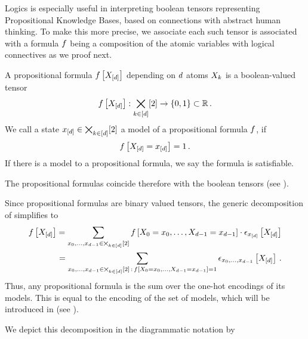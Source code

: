 
Logics is especially useful in interpreting boolean tensors representing Propositional Knowledge Bases, based on connections with abstract human thinking.
To make this more precise, we associate each such tensor is associated with a formula $f$ being a composition of the atomic variables with logical connectives as we proof next.

\begin{definition}\label{def:formulas}
	A propositional formula $f\left[X_{[d]}\right]$ depending on $d$ atoms $X_{k}$ is a boolean-valued tensor
	\begin{align*}
		f\left[X_{[d]}\right] : \bigtimes_{k\in[d]}[2] \rightarrow \{0,1\} \subset \mathbb{R} \, .
	\end{align*}
	We call a state $x_{[d]} \in \bigtimes_{k\in[d]}[2]$ a model of a propositional formula $f$, if
	\begin{align*}
		f\left[X_{[d]}=x_{[d]}\right]=1 \, .
	\end{align*}
	If there is a model to a propositional formula, we say the formula is satisfiable.
\end{definition}

The propositional formulas coincide therefore with the boolean tensors (see ).


Since propositional formulas are binary valued tensors, the generic decomposition of  simplifies to
\begin{align}\label{eq:formulaModelDecomposition}
	f\left[X_{[d]}\right] = \sum_{x_{0},\ldots,x_{d-1}\in\bigtimes_{k\in[d]}[2]} f\left[X_{0}=x_{0},\ldots,X_{d-1}=x_{d-1}\right] \cdot \epsilon_{x_{[d]}}\left[X_{[d]}\right] \\
	= \sum_{x_{0},\ldots,x_{d-1}\in\bigtimes_{k\in[d]}[2] \, : \, f\left[X_{0}=x_{0},\ldots,X_{d-1}=x_{d-1}\right]=1}  \epsilon_{x_{0},\ldots,x_{d-1}}\left[X_{[d]}\right] \, .
\end{align}
Thus, any propositional formula is the sum over the one-hot encodings of its models.
This is equal to the encoding of the set of models, which will be introduced in  (see ).

We depict this decomposition in the diagrammatic notation by
\begin{center}
	
\end{center}




